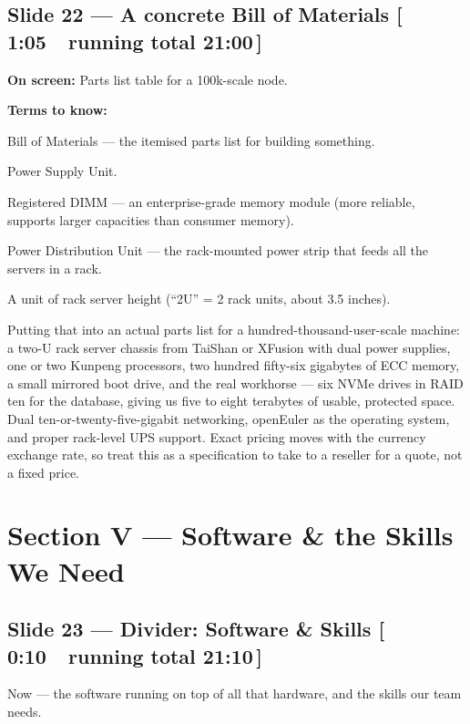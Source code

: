 \documentclass[11pt]{article}
\newcommand{\onscreen}[1]{\noindent\textbf{\color{sovGrey}On screen:} #1\par\vspace{4pt}}
\newcommand{\timing}[2]{\hfill{\normalsize\color{sovGrey}[\,#1\ \textbar\ running total #2\,]}}
\newenvironment{terms}
  {\noindent\textbf{\color{sovGrey}Terms to know:}
   \begin{description}[leftmargin=0pt,style=sameline,labelindent=0pt,itemsep=2pt,topsep=2pt,font=\normalfont\bfseries\color{sovDark}]}
  {\end{description}\vspace{2pt}}
\begin{document}
\subsection*{Slide 22 --- A concrete Bill of Materials \timing{1:05}{21:00}}
\onscreen{Parts list table for a 100k-scale node.}
\begin{terms}
  \item[BOM] Bill of Materials --- the itemised parts list for building something.
  \item[PSU] Power Supply Unit.
  \item[RDIMM] Registered DIMM --- an enterprise-grade memory module (more reliable,
    supports larger capacities than consumer memory).
  \item[PDU] Power Distribution Unit --- the rack-mounted power strip that feeds all
    the servers in a rack.
  \item[2U] A unit of rack server height (``2U'' = 2 rack units, about 3.5 inches).
\end{terms}
\begin{sayit}
Putting that into an actual parts list for a hundred-thousand-user-scale machine: a
two-U rack server chassis from TaiShan or XFusion with dual power supplies, one or two
Kunpeng processors, two hundred fifty-six gigabytes of ECC memory, a small mirrored boot
drive, and the real workhorse --- six NVMe drives in RAID ten for the database, giving
us five to eight terabytes of usable, protected space. Dual ten-or-twenty-five-gigabit
networking, openEuler as the operating system, and proper rack-level UPS support. Exact
pricing moves with the currency exchange rate, so treat this as a specification to take
to a reseller for a quote, not a fixed price.
\end{sayit}

\section{Section V --- Software \& the Skills We Need}

\subsection*{Slide 23 --- Divider: Software \& Skills \timing{0:10}{21:10}}
\begin{sayit}
Now --- the software running on top of all that hardware, and the skills our team needs.
\end{sayit}
\end{document}
